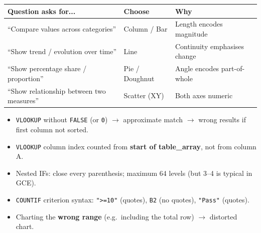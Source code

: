 \documentclass[11pt]{article}
\begin{document}
\begin{aretenir}
\begin{center}
\begin{tabularx}{\linewidth}{|l|X|X|}\hline
\textbf{Question asks for...} & \textbf{Choose} & \textbf{Why} \\ \hline
``Compare values across categories'' & Column / Bar & Length encodes magnitude \\ \hline
``Show trend / evolution over time'' & Line & Continuity emphasises change \\ \hline
``Show percentage share / proportion'' & Pie / Doughnut & Angle encodes part-of-whole \\ \hline
``Show relationship between two measures'' & Scatter (XY) & Both axes numeric \\ \hline
\end{tabularx}
\end{center}
\end{aretenir}

\begin{attention}
\begin{itemize}
\item \texttt{VLOOKUP} without \texttt{FALSE} (or \texttt{0}) $\rightarrow$ approximate match $\rightarrow$ wrong results if first column not sorted.
\item \texttt{VLOOKUP} column index counted from \textbf{start of table\_array}, not from column A.
\item Nested IFs: close every parenthesis; maximum 64 levels (but 3--4 is typical in GCE).
\item \texttt{COUNTIF} criterion syntax: \texttt{">=10"} (quotes), \texttt{B2} (no quotes), \texttt{"Pass"} (quotes).
\item Charting the \textbf{wrong range} (e.g.\ including the total row) $\rightarrow$ distorted chart.
\end{itemize}
\end{attention}
\end{document}
